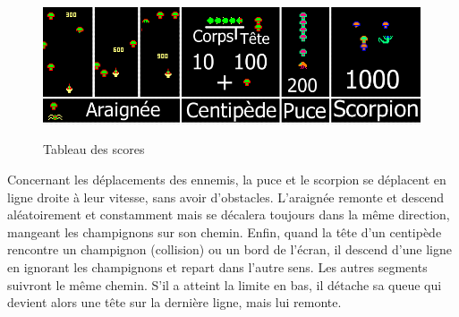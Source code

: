 \begin{figure}[ht]%
\center
\caption{Tableau des scores}%
\smallskip
\includegraphics[width=\textwidth]{imgs/scoresCentipede.png}%
\label{fig:ScoresCenti}%
\end{figure}

Concernant les déplacements des ennemis, la puce et le scorpion se déplacent en ligne droite à leur vitesse, sans avoir d'obstacles. L'araignée remonte et descend aléatoirement et constamment mais se décalera toujours dans la même direction, mangeant les champignons sur son chemin. Enfin, quand la tête d'un centipède rencontre un champignon (collision) ou un bord de l'écran, il descend d'une ligne en ignorant les champignons et repart dans l'autre sens. Les autres segments suivront le même chemin. S'il a atteint la limite en bas, il détache sa queue qui devient alors une tête sur la dernière ligne, mais lui remonte.


